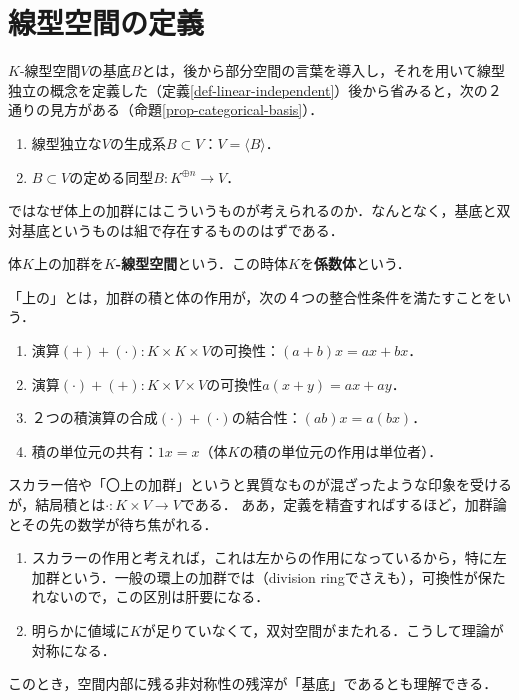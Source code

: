\documentclass[uplatex, 12pt, dvipdfmx]{jsreport}
\begin{document}
\section{線型空間の定義}

\begin{screen}
    $K$-線型空間$V$の基底$B$とは，後から部分空間の言葉を導入し，それを用いて線型独立の概念を定義した（定義\ref{def-linear-independent}）後から省みると，次の２通りの見方がある（命題\ref{prop-categorical-basis}）．
    \begin{enumerate}
        \item 線型独立な$V$の生成系$B\subset V$：$V=\langle B\rangle$．
        \item $B\subset V$の定める同型$B:K^{\oplus n}\to V$．
    \end{enumerate}
    ではなぜ体上の加群にはこういうものが考えられるのか．なんとなく，基底と双対基底というものは組で存在するもののはずである．
\end{screen}

\begin{definition}
    体$K$上の加群を\textbf{$K$-線型空間}という．この時体$K$を\textbf{係数体}という．

    「上の」とは，加群の積と体の作用が，次の４つの整合性条件を満たすことをいう．
    \begin{enumerate}
        \item 演算$(+)+(\cdot):K\times K\times V$の可換性：$(a+b)x=ax+bx$．
        \item 演算$(\cdot)+(+):K\times V\times V$の可換性$a(x+y)=ax+ay$．
        \item ２つの積演算の合成$(\cdot)+(\cdot)$の結合性：$(ab)x=a(bx)$．
        \item 積の単位元の共有：$1x=x$（体$K$の積の単位元の作用は単位者）．
    \end{enumerate}
\end{definition}
\begin{remark}[線型空間の定義の非対称性]
    スカラー倍や「〇上の加群」というと異質なものが混ざったような印象を受けるが，結局積とは$\cdot:K\times V\to V$である．
    ああ，定義を精査すればするほど，加群論とその先の数学が待ち焦がれる．
    \begin{enumerate}
        \item スカラーの作用と考えれば，これは左からの作用になっているから，特に左加群という．一般の環上の加群では（division ringでさえも），可換性が保たれないので，この区別は肝要になる．
        \item 明らかに値域に$K$が足りていなくて，双対空間がまたれる．こうして理論が対称になる．
    \end{enumerate}
    このとき，空間内部に残る非対称性の残滓が「基底」であるとも理解できる．
\end{remark}
\end{document}
